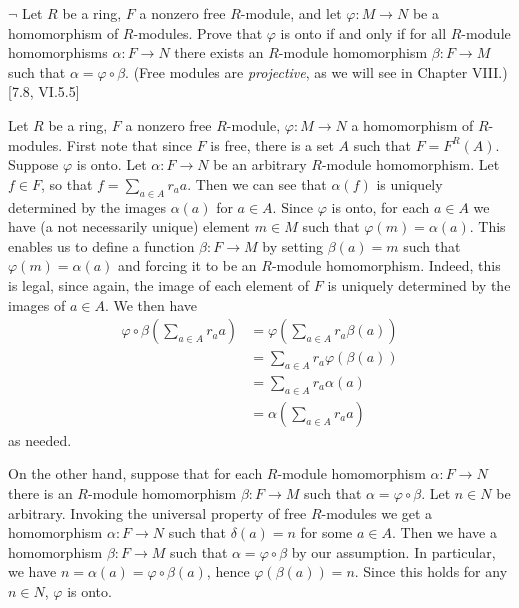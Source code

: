 \begin{problem}
	$\neg$ Let $R$ be a ring, $F$ a nonzero free $R$-module, and let $\varphi: M \to N$ be a homomorphism of $R$-modules. Prove that $\varphi$ is onto if and only if for all $R$-module homomorphisms $\alpha: F \to N$ there exists an $R$-module homomorphism $\beta: F \to M$ such that $\alpha = \varphi \circ \beta$. (Free modules are \emph{projective}, as we will see in Chapter VIII.) [7.8, VI.5.5]
\end{problem}

\begin{solution}
	Let $R$ be a ring, $F$ a nonzero free $R$-module, $\varphi: M \to N$ a homomorphism of $R$-modules. First note that since $F$ is free, there is a set $A$ such that $F = F^R(A)$. Suppose $\varphi$ is onto. Let $\alpha: F \to N$ be an arbitrary $R$-module homomorphism. Let $f \in F$, so that $f = \sum_{a \in A} r_a a$. Then we can see that  $\alpha(f)$ is uniquely determined by the images $\alpha(a)$ for $a \in A$. Since $\varphi$ is onto, for each $a \in A$ we have (a not necessarily unique) element $m \in M$ such that $\varphi(m) = \alpha(a)$. This enables us to define a function $\beta: F \to M$ by setting $\beta(a) = m$ such that $\varphi(m) = \alpha(a)$ and forcing it to be an $R$-module homomorphism. Indeed, this is legal, since again, the image of each element of $F$ is uniquely determined by the images of $a \in A$. We then have
	\begin{align*}
		\varphi \circ \beta (\sum_{a \in A} r_a a) &= \varphi(\sum_{a \in A} r_a \beta(a)) \\
		&= \sum_{a \in A} r_a \varphi(\beta(a)) \\
		&= \sum_{a \in A} r_a \alpha(a) \\
		&= \alpha(\sum_{a \in A} r_a a)
	\end{align*}
	as needed.
	
	On the other hand, suppose that for each $R$-module homomorphism $\alpha: F \to N$ there is an $R$-module homomorphism $\beta: F \to M$ such that $\alpha = \varphi \circ \beta$. Let $n \in N$ be arbitrary. Invoking the universal property of free $R$-modules we get a homomorphism $\alpha: F \to N$ such that $\delta(a) = n$ for some $a \in A$. Then we have a homomorphism $\beta: F \to M$ such that $\alpha = \varphi \circ \beta$ by our assumption. In particular, we have $n = \alpha(a) = \varphi \circ \beta(a)$, hence $\varphi(\beta(a)) = n$. Since this holds for any $n \in N$, $\varphi$ is onto.
\end{solution}

